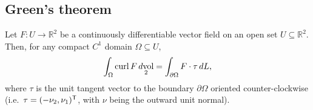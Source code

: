 \subsection{Green's theorem}

\begin{theorem}
\label{thm:greens_theorem}
Let $F : U \to \mathbb{R}^2$ be a continuously differentiable vector field on an open set $U \subseteq \mathbb{R}^2$. Then, for any compact $C^1$ domain $\Omega \subseteq U$,
\[\int_\Omega \operatorname{curl} F \mathop{d\text{vol}}_2 = \int_{\partial\Omega} F \cdot \tau \,dL,\]
where $\tau$ is the unit tangent vector to the boundary $\partial\Omega$ oriented counter-clockwise (i.e.\ $\tau = (-\nu_2, \nu_1)^{\mathsf{T}}$, with $\nu$ being the outward unit normal).
\end{theorem}

